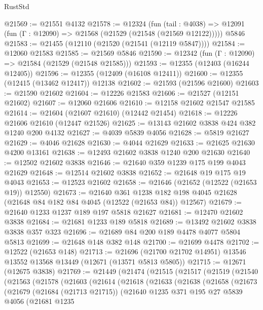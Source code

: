 \begin{lexlean}{RustStd}
\begin{coremodule}
@21569 := @21551 @4132
@21578 := @12324
    (fun (tail : @4038) => @12091 (fun (Γ : @12090) => @21568 (@21529 (@21548 (@21569 @12122)))))
    @5846
@21583 := @21455 (@12110 (@21520 (@21541 (@12119 @5847))))
@21584 := @12060 @21583
@21585 := @21569 @5846
@21590 := @12342 (fun (Γ : @12090) => @21584 (@21529 (@21548 @21585)))
@21593 := @12355 (@12403 (@16244 @12405))
@21596 := @12355 (@12409 (@16108 @12411))
@21600 := @12355 (@12415 (@13462 @12417)) @12138
@21602 := @21593 (@21596 @21600)
@21603 := @21590 @21602
@21604 := @12226 @21583
@21606 := @21527 (@12151 @21602)
@21607 := @12060 @21606
@21610 := @12158 @21602 @21547 @21585
@21614 := @21604 (@21607 @21610) (@12442 @21454)
@21618 := @12226 @21606 @21610 (@12447 @21526)
@21625 := @13143 @21602 @3838 @424 @382 @1240 @200 @4132
@21627 := @4039 @5839 @4056
@21628 := @5819 @21627
@21629 := @4046 @21628
@21630 := @4044 @21629
@21633 := @21625 @21630 @4200 @13161
@21638 := @12493 @21602 @3838 @1240 @200 @21630
@21640 := @12502 @21602 @3838
@21646 := @21640 @359 @1239 @175 @199 @4043 @21629
@21648 := @12514 @21602 @3838
@21652 := @21648 @19 @175 @19 @4043
@21653 := @12523 @21602
@21658 := @21646 (@21652 (@12522 (@21653 @19)) @12550)
@21673 := @21640
    @361
    @1238
    @182
    @198
    @4045
    @21628
    (@21648 @84 @182 @84 @4045 (@12522 (@21653 @84)) @12567)
@21679 := @21640 @1233 @1237 @189 @197 @5818 @21627
@21681 := @12470 @21602 @3838
@21684 := @21681 @1233 @189 @5818
@21689 := @13492 @21602 @3838 @3838 @357 @323
@21696 := @21689 @84 @200 @189 @4478 @4077 @5804 @5813
@21699 := @21648 @148 @382 @148
@21700 := @21699 @4478
@21702 := @12522 (@21653 @148)
@21713 := @21696 (@21700 @21702 @14951) @13546 @13552 @13568 @13449 (@12671 (@13571 @5813 @5805))
@21715 := @12671 (@12675 @3838)
@21769 := @21449
    (@21474
      (@21515
        (@21517
          (@21519
            (@21540
              (@21563
                (@21578
                  (@21603
                    (@21614
                      (@21618
                        (@21633
                          (@21638
                            (@21658
                              (@21673
                                (@21679
                                  (@21684 (@21713 @21715))
                                  (@21640
                                    @1235
                                    @371
                                    @195
                                    @27
                                    @5839
                                    @4056
                                    (@21681
                                      @1235

\end{coremodule}
\end{lexlean}
